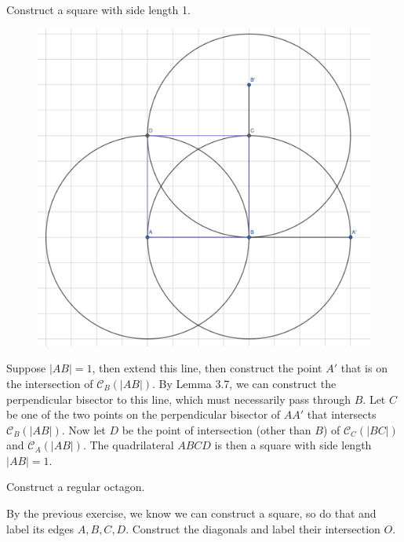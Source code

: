 \documentclass[twoside,10pt]{article}
\begin{document}

\begin{exer}[3.5]
Construct a square with side length 1.
\end{exer}

\begin{figure}[H]
	\centering
	\includegraphics[scale=0.2]{fig/5}
\end{figure}

Suppose $|AB|=1$, then extend this line, then construct the point $A'$ that is on the intersection of $\mathcal{C}_B(|AB|)$. By Lemma 3.7, we can construct the perpendicular bisector to this line, which must necessarily pass through $B$. Let $C$ be one of the two points on the perpendicular bisector of $AA'$ that intersects $\mathcal{C}_B(|AB|)$. Now let $ D$ be the point of intersection (other than $B$) of $\mathcal{C}_C(|BC|)$ and $\mathcal{C}_A(|AB|)$. The quadrilateral $ABCD$ is then a square with side length $|AB|=1$.

\newpage

\begin{exer}[3.16]
Construct a regular octagon.
\end{exer}

By the previous exercise, we know we can construct a square, so do that and label its edges $A,B,C,D$. Construct the diagonals and label their intersection $O$.
\end{document}
